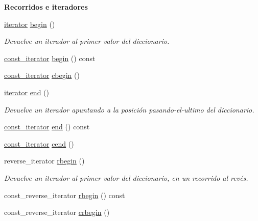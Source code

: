 \begin{Indent}{\bf \-Recorridos e iteradores}\par
\begin{DoxyCompactItemize}
\item 
\hyperlink{classaed2_1_1iterator_1_1iterator}{iterator} \hyperlink{classaed2_1_1iterator_af8901de173468531c58458b581d345a6}{begin} ()
\begin{DoxyCompactList}\small\item\em \-Devuelve un iterador al primer valor del diccionario. \end{DoxyCompactList}\item 
\hyperlink{classaed2_1_1iterator_1_1const__iterator}{const\-\_\-iterator} \hyperlink{classaed2_1_1iterator_a102b6014e02bf9a1ed551f9cdea027d0}{begin} () const 
\item 
\hyperlink{classaed2_1_1iterator_1_1const__iterator}{const\-\_\-iterator} \hyperlink{classaed2_1_1iterator_a89cca73bd2e4df39de7c412c441d6da1}{cbegin} ()
\item 
\hyperlink{classaed2_1_1iterator_1_1iterator}{iterator} \hyperlink{classaed2_1_1iterator_a67caf9468be999e9be96b7add5d79946}{end} ()
\begin{DoxyCompactList}\small\item\em \-Devuelve un iterador apuntando a la posición pasando-\/el-\/ultimo del diccionario. \end{DoxyCompactList}\item 
\hyperlink{classaed2_1_1iterator_1_1const__iterator}{const\-\_\-iterator} \hyperlink{classaed2_1_1iterator_ae08e4f49cbbd2dfa756609aceb431633}{end} () const 
\item 
\hyperlink{classaed2_1_1iterator_1_1const__iterator}{const\-\_\-iterator} \hyperlink{classaed2_1_1iterator_a2d0d226485d9280d16a739d0b9dae525}{cend} ()
\item 
reverse\-\_\-iterator \hyperlink{classaed2_1_1iterator_a296638725dce2fc10316d18563eb3131}{rbegin} ()
\begin{DoxyCompactList}\small\item\em \-Devuelve un iterador al primer valor del diccionario, en un recorrido al revés. \end{DoxyCompactList}\item 
const\-\_\-reverse\-\_\-iterator \hyperlink{classaed2_1_1iterator_ae6b990a72769289b9cd0236a91c3b43f}{rbegin} () const 
\item 
const\-\_\-reverse\-\_\-iterator \hyperlink{classaed2_1_1iterator_aa4b6ce667258581859351db42cfd3ee4}{crbegin} ()

\end{DoxyCompactItemize}
\end{Indent}
